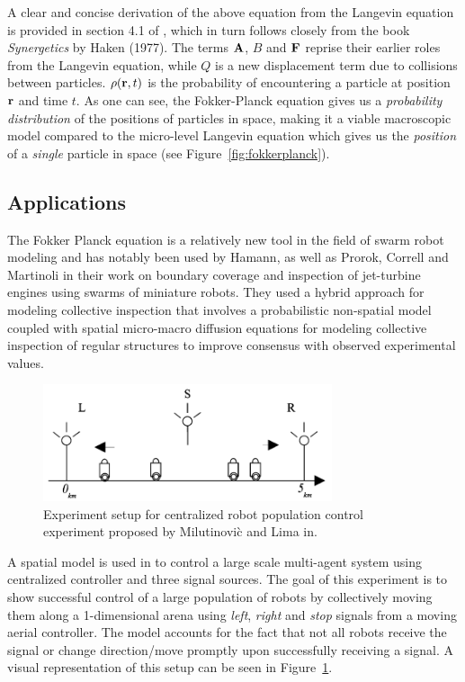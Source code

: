 \documentclass[Main.tex]{subfiles}
\begin{document}
A clear and concise derivation of the above equation from the Langevin equation is provided in section 4.1 of \cite{Hamann2010}, which in turn follows closely from the book \emph{Synergetics} by Haken (1977). The terms $\mathbf{A}$, $B$ and $\mathbf{F}$ reprise their earlier roles from the Langevin equation, while $Q$ is a new displacement term due to collisions between particles. $\rho(\mathbf{r}, t)$ is the probability of encountering a particle at position $\mathbf{r}$ and time $t$. As one can see, the Fokker-Planck equation gives us a \emph{probability distribution} of the positions of particles in space, making it a viable macroscopic model compared to the micro-level Langevin equation which gives us the \emph{position} of a \emph{single} particle in space (see Figure~\ref{fig:fokkerplanck}).

\subsection{Applications}
The Fokker Planck equation is a relatively new tool in the field of swarm robot modeling and has notably been used by Hamann\cite{Hamann2008, Hamann2010}, as well as Prorok, Correll and Martinoli\cite{Prorok2011} in their work on boundary coverage and inspection of jet-turbine engines using swarms of miniature robots. They used a hybrid approach for modeling collective inspection that involves a probabilistic non-spatial model coupled with spatial micro-macro diffusion equations for modeling collective inspection of regular structures to improve consensus with observed experimental values. 

\begin{figure}[!ht]
\centering\includegraphics[width=8.5cm]{spatSignal.png}
\centering\caption{Experiment setup for centralized robot population control experiment proposed by Milutinovi\`{c} and Lima in\cite{Milutinovi2006}.}\label{fig:signal}
\end{figure}

A spatial model is used in\cite{Milutinovi2006} to control a large scale multi-agent system using centralized controller and three signal sources. The goal of this experiment is to show successful control of a large population of robots by collectively moving them along a 1-dimensional arena using \emph{left}, \emph{right} and \emph{stop} signals from a moving aerial controller. The model accounts for the fact that not all robots receive the signal or change direction/move promptly upon successfully receiving a signal. A visual representation of this setup can be seen in Figure~\ref{fig:signal}.
\end{document}
